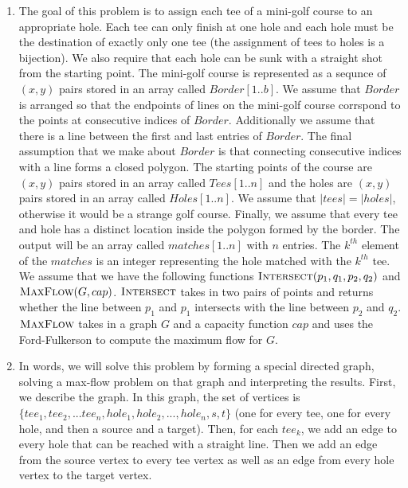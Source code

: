 \documentclass{article}
\begin{document}

\begin{enumerate}
    \item The goal of this problem is to assign each tee of a mini-golf course to an appropriate hole.
    Each tee can only finish at one hole and each hole must be the destination of exactly only one tee (the assignment of tees to holes is a bijection).
    We also require that each hole can be sunk with a straight shot from the starting point. \parspace
    The mini-golf course is represented as a sequnce of $(x,y)$ pairs stored in an array called $Border[1..b]$.
    We assume that $Border$ is arranged so that the endpoints of lines on the mini-golf course corrspond to the points at consecutive indices of $Border$.
    Additionally we assume that there is a line between the first and last entries of $Border$.
    The final assumption that we make about $Border$ is that connecting consecutive indices with a line forms a closed polygon. \parspace
    The starting points of the course are $(x,y)$ pairs stored in an array called $Tees[1..n]$ and the holes are $(x,y)$ pairs stored in an array called $Holes[1..n]$.
    We assume that $|tees| = |holes|$, otherwise it would be a strange golf course.
    Finally, we assume that every tee and hole has a distinct location inside the polygon formed by the border. \parspace
    The output will be an array called $matches[1..n]$ with $n$ entries.
    The $k^{th}$ element of the $matches$ is an integer representing the hole matched with the $k^{th}$ tee. \parspace
    We assume that we have the following functions $\textsc{Intersect}(p_1, q_1, p_2, q_2)$ and $\textsc{MaxFlow}(G, cap)$.
    $\textsc{Intersect}$ takes in two pairs of points and returns whether the line between $p_1$ and $p_1$ intersects with the line between $p_2$ and $q_2$.
    $\textsc{MaxFlow}$ takes in a graph $G$ and a capacity function $cap$ and uses the Ford-Fulkerson to compute the maximum flow for $G$.
    \item In words, we will solve this problem by forming a special directed graph, solving a max-flow problem on that graph and interpreting the results.
    First, we describe the graph.
    In this graph, the set of vertices is $\{ tee_1, tee_2, ... tee_n, hole_1, hole_2, ..., hole_n, s, t \}$ (one for every tee, one for every hole, and then a source and a target).
    Then, for each $tee_k$, we add an edge to every hole that can be reached with a straight line.
    Then we add an edge from the source vertex to every tee vertex as well as an edge from every hole vertex to the target vertex.

\end{enumerate}
\end{document}

